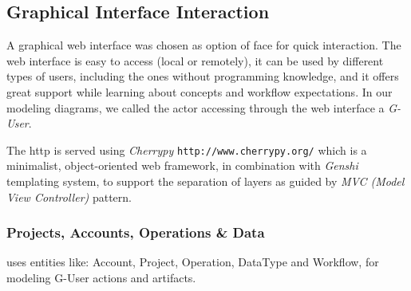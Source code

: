 
\subsection{Graphical Interface Interaction}

A graphical web interface was chosen as option of \TVB face for quick interaction. The web interface is easy to access (local or remotely),
it can be used by different types of users, including the ones without programming knowledge, and it offers great 
support while learning about \TVB concepts and workflow expectations. 
In our modeling diagrams, we called the actor accessing \TVB through the web interface a \emph{G-User}.

The http is served using \emph{Cherrypy} \texttt{http://www.cherrypy.org/} which is a minimalist, object-oriented web framework, 
in combination with \emph{Genshi} templating system, to support the separation of layers as guided by \emph{MVC (Model View Controller)} pattern.

	\subsubsection{Projects, Accounts, Operations \& Data}

\TVB uses entities like: Account, Project, Operation, DataType and Workflow, for modeling G-User actions and artifacts. 

